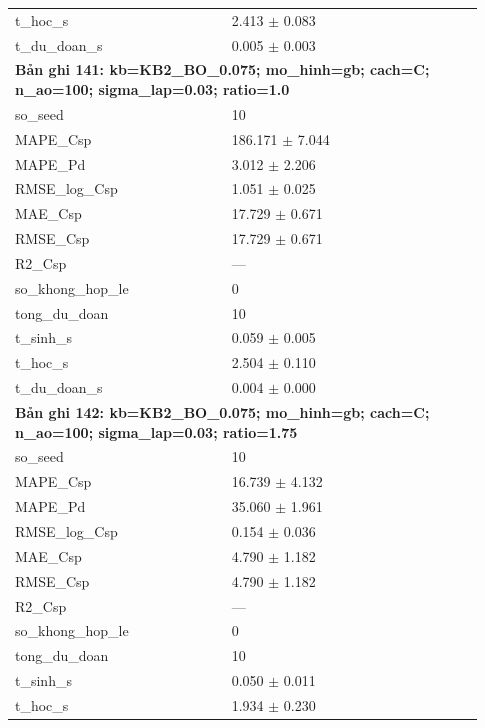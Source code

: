 \begin{longtable}{p{0.43\linewidth}p{0.50\linewidth}}
t\_\allowbreak hoc\_\allowbreak s & 2.413 $\pm$ 0.083 \\
t\_\allowbreak du\_\allowbreak doan\_\allowbreak s & 0.005 $\pm$ 0.003 \\
\midrule
\multicolumn{2}{p{0.95\linewidth}}{\textbf{Bản ghi 141: kb=KB2\_BO\_0.075; mo\_hinh=gb; cach=C; n\_ao=100; sigma\_lap=0.03; ratio=1.0}} \\
so\_\allowbreak seed & 10 \\
MAPE\_\allowbreak Csp & 186.171 $\pm$ 7.044 \\
MAPE\_\allowbreak Pd & 3.012 $\pm$ 2.206 \\
RMSE\_\allowbreak log\_\allowbreak Csp & 1.051 $\pm$ 0.025 \\
MAE\_\allowbreak Csp & 17.729 $\pm$ 0.671 \\
RMSE\_\allowbreak Csp & 17.729 $\pm$ 0.671 \\
R2\_\allowbreak Csp & — \\
so\_\allowbreak khong\_\allowbreak hop\_\allowbreak le & 0 \\
tong\_\allowbreak du\_\allowbreak doan & 10 \\
t\_\allowbreak sinh\_\allowbreak s & 0.059 $\pm$ 0.005 \\
t\_\allowbreak hoc\_\allowbreak s & 2.504 $\pm$ 0.110 \\
t\_\allowbreak du\_\allowbreak doan\_\allowbreak s & 0.004 $\pm$ 0.000 \\
\midrule
\multicolumn{2}{p{0.95\linewidth}}{\textbf{Bản ghi 142: kb=KB2\_BO\_0.075; mo\_hinh=gb; cach=C; n\_ao=100; sigma\_lap=0.03; ratio=1.75}} \\
so\_\allowbreak seed & 10 \\
MAPE\_\allowbreak Csp & 16.739 $\pm$ 4.132 \\
MAPE\_\allowbreak Pd & 35.060 $\pm$ 1.961 \\
RMSE\_\allowbreak log\_\allowbreak Csp & 0.154 $\pm$ 0.036 \\
MAE\_\allowbreak Csp & 4.790 $\pm$ 1.182 \\
RMSE\_\allowbreak Csp & 4.790 $\pm$ 1.182 \\
R2\_\allowbreak Csp & — \\
so\_\allowbreak khong\_\allowbreak hop\_\allowbreak le & 0 \\
tong\_\allowbreak du\_\allowbreak doan & 10 \\
t\_\allowbreak sinh\_\allowbreak s & 0.050 $\pm$ 0.011 \\
t\_\allowbreak hoc\_\allowbreak s & 1.934 $\pm$ 0.230 \\

\end{longtable}
